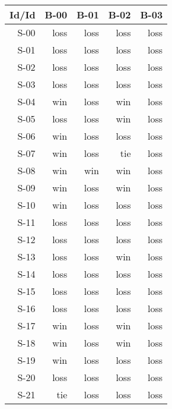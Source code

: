 \begin{tabular}{ | r | r | r | r | r | }
    \hline
        Id/Id  &   B-00  &   B-01  &   B-02  &   B-03  \\
    \hline
    \hline
         S-00  &   loss  &   loss  &   loss  &   loss  \\
    \hline
         S-01  &   loss  &   loss  &   loss  &   loss  \\
    \hline
         S-02  &   loss  &   loss  &   loss  &   loss  \\
    \hline
         S-03  &   loss  &   loss  &   loss  &   loss  \\
    \hline
         S-04  &    win  &   loss  &    win  &   loss  \\
    \hline
         S-05  &   loss  &   loss  &    win  &   loss  \\
    \hline
         S-06  &    win  &   loss  &   loss  &   loss  \\
    \hline
         S-07  &    win  &   loss  &    tie  &   loss  \\
    \hline
         S-08  &    win  &    win  &    win  &   loss  \\
    \hline
         S-09  &    win  &   loss  &    win  &   loss  \\
    \hline
         S-10  &    win  &   loss  &   loss  &   loss  \\
    \hline
         S-11  &   loss  &   loss  &   loss  &   loss  \\
    \hline
         S-12  &   loss  &   loss  &   loss  &   loss  \\
    \hline
         S-13  &   loss  &   loss  &    win  &   loss  \\
    \hline
         S-14  &   loss  &   loss  &   loss  &   loss  \\
    \hline
         S-15  &   loss  &   loss  &   loss  &   loss  \\
    \hline
         S-16  &   loss  &   loss  &   loss  &   loss  \\
    \hline
         S-17  &    win  &   loss  &    win  &   loss  \\
    \hline
         S-18  &    win  &   loss  &    win  &   loss  \\
    \hline
         S-19  &    win  &   loss  &   loss  &   loss  \\
    \hline
         S-20  &   loss  &   loss  &   loss  &   loss  \\
    \hline
         S-21  &    tie  &   loss  &   loss  &   loss  \\

\end{tabular}
